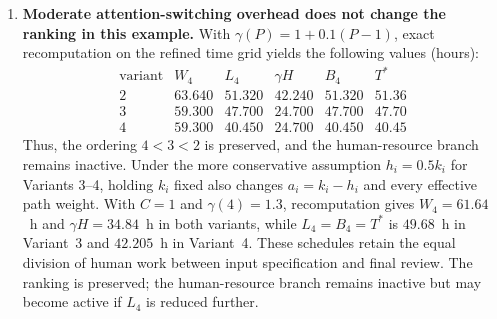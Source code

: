 \begin{enumerate}
  \item \textbf{Moderate attention-switching overhead does not change the
  ranking in this example.} With $\gamma(P)=1+0.1(P-1)$, exact recomputation on
  the refined time grid yields the following values (hours):
  \[
  \begin{array}{c|ccccc}
  \text{variant} & W_4 & L_4 & \gamma H & B_4 & T^* \\ \hline
  2 & 63.640 & 51.320 & 42.240 & 51.320 & 51.36 \\
  3 & 59.300 & 47.700 & 24.700 & 47.700 & 47.70 \\
  4 & 59.300 & 40.450 & 24.700 & 40.450 & 40.45
  \end{array}
  \]
  Thus, the ordering $4<3<2$ is preserved, and the human-resource branch
  remains inactive. Under the more conservative assumption $h_i=0.5k_i$ for
  Variants 3--4, holding $k_i$ fixed also changes $a_i=k_i-h_i$ and every
  effective path weight. With $C=1$ and $\gamma(4)=1.3$, recomputation gives
  $W_4=61.64$~h and $\gamma H=34.84$~h in both variants, while
  $L_4=B_4=T^*$ is $49.68$~h in Variant~3 and $42.205$~h in Variant~4.
  These schedules retain the equal division of human work between input
  specification and final review. The ranking is preserved; the human-resource
  branch remains inactive but may become active if $L_4$ is reduced further.
\end{enumerate}


